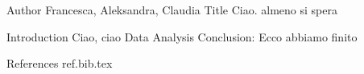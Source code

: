 Author Francesca, Aleksandra, Claudia	
Title Ciao. almeno si spera

Introduction Ciao, ciao
Data
Analysis
Conclusion: Ecco abbiamo finito

References 
ref.bib.tex
